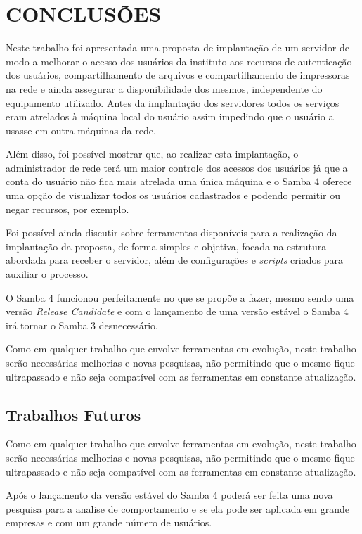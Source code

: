 \chapter{CONCLUSÕES}

Neste trabalho foi apresentada uma proposta de implantação de um servidor de modo a melhorar o acesso dos usuários da instituto aos recursos de autenticação dos usuários, compartilhamento de arquivos e compartilhamento de impressoras na rede e ainda assegurar a disponibilidade dos mesmos, independente do equipamento utilizado. Antes da implantação dos servidores todos os serviços eram atrelados à máquina local do usuário assim impedindo que o usuário a usasse em outra máquinas da rede.

Além disso, foi possível mostrar que, ao realizar esta implantação, o administrador de rede terá um maior controle dos acessos dos usuários já que a conta do usuário não fica mais atrelada uma única máquina e o Samba 4 oferece uma opção de visualizar todos os usuários cadastrados e podendo permitir ou negar recursos, por exemplo.

Foi possível ainda discutir sobre ferramentas disponíveis para a realização da implantação da proposta, de forma simples e objetiva, focada na estrutura abordada para receber o servidor, além de configurações e \textit{scripts} criados para auxiliar o processo.


O Samba 4 funcionou perfeitamente no que se propõe a fazer, mesmo sendo uma versão \textit{Release Candidate} e com o lançamento de uma versão estável o Samba 4 irá tornar o Samba 3 desnecessário.

Como em qualquer trabalho que envolve ferramentas em evolução, neste trabalho serão necessárias melhorias e novas pesquisas, não permitindo que o mesmo fique ultrapassado e não seja compatível com as ferramentas em constante atualização.

\section{Trabalhos Futuros}

Como em qualquer trabalho que envolve ferramentas em evolução, neste trabalho serão necessárias melhorias e novas pesquisas, não permitindo que o mesmo fique ultrapassado e não seja compatível com as ferramentas em constante atualização.

Após o lançamento da versão estável do Samba 4 poderá ser feita uma nova pesquisa para a analise de comportamento e se ela pode ser aplicada em grande empresas e com um grande número de usuários.



